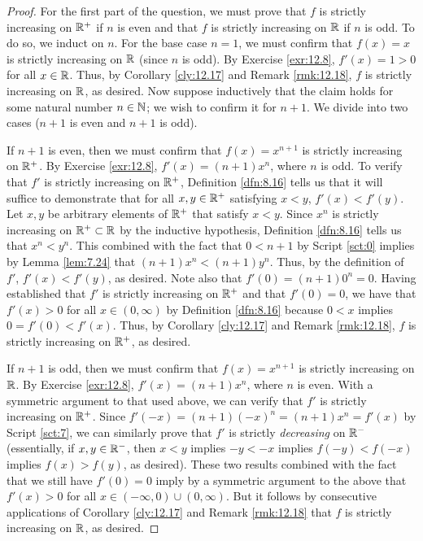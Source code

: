\documentclass[../main.tex]{subfiles}
\begin{document}
\begin{exercise}
\begin{proof}
        For the first part of the question, we must prove that $f$ is strictly increasing on $\mathbb{R}^+$ if $n$ is even and that $f$ is strictly increasing on $\mathbb{R}$ if $n$ is odd. To do so, we induct on $n$. For the base case $n=1$, we must confirm that $f(x)=x$ is strictly increasing on $\mathbb{R}$ (since $n$ is odd). By Exercise \ref{exr:12.8}, $f'(x)=1>0$ for all $x\in\mathbb{R}$. Thus, by Corollary \ref{cly:12.17} and Remark \ref{rmk:12.18}, $f$ is strictly increasing on $\mathbb{R}$, as desired. Now suppose inductively that the claim holds for some natural number $n\in\mathbb{N}$; we wish to confirm it for $n+1$. We divide into two cases ($n+1$ is even and $n+1$ is odd).\par\smallskip
        If $n+1$ is even, then we must confirm that $f(x)=x^{n+1}$ is strictly increasing on $\mathbb{R}^+$. By Exercise \ref{exr:12.8}, $f'(x)=(n+1)x^n$, where $n$ is odd. To verify that $f'$ is strictly increasing on $\mathbb{R}^+$, Definition \ref{dfn:8.16} tells us that it will suffice to demonstrate that for all $x,y\in\mathbb{R}^+$ satisfying $x<y$, $f'(x)<f'(y)$. Let $x,y$ be arbitrary elements of $\mathbb{R}^+$ that satisfy $x<y$. Since $x^n$ is strictly increasing on $\mathbb{R}^+\subset\mathbb{R}$ by the inductive hypothesis, Definition \ref{dfn:8.16} tells us that $x^n<y^n$. This combined with the fact that $0<n+1$ by Script \ref{sct:0} implies by Lemma \ref{lem:7.24} that $(n+1)x^n<(n+1)y^n$. Thus, by the definition of $f'$, $f'(x)<f'(y)$, as desired. Note also that $f'(0)=(n+1)0^n=0$. Having established that $f'$ is strictly increasing on $\mathbb{R}^+$ and that $f'(0)=0$, we have that $f'(x)>0$ for all $x\in(0,\infty)$ by Definition \ref{dfn:8.16} because $0<x$ implies $0=f'(0)<f'(x)$. Thus, by Corollary \ref{cly:12.17} and Remark \ref{rmk:12.18}, $f$ is strictly increasing on $\mathbb{R}^+$, as desired.\par\smallskip
        If $n+1$ is odd, then we must confirm that $f(x)=x^{n+1}$ is strictly increasing on $\mathbb{R}$. By Exercise \ref{exr:12.8}, $f'(x)=(n+1)x^n$, where $n$ is even. With a symmetric argument to that used above, we can verify that $f'$ is strictly increasing on $\mathbb{R}^+$. Since $f'(-x)=(n+1)(-x)^n=(n+1)x^n=f'(x)$ by Script \ref{sct:7}, we can similarly prove that $f'$ is strictly \emph{decreasing} on $\mathbb{R}^-$ (essentially, if $x,y\in\mathbb{R}^-$, then $x<y$ implies $-y<-x$ implies $f(-y)<f(-x)$ implies $f(x)>f(y)$, as desired). These two results combined with the fact that we still have $f'(0)=0$ imply by a symmetric argument to the above that $f'(x)>0$ for all $x\in(-\infty,0)\cup(0,\infty)$. But it follows by consecutive applications of Corollary \ref{cly:12.17} and Remark \ref{rmk:12.18} that $f$ is strictly increasing on $\mathbb{R}$, as desired.\par\medskip

\end{proof}
\end{exercise}
\end{document}
